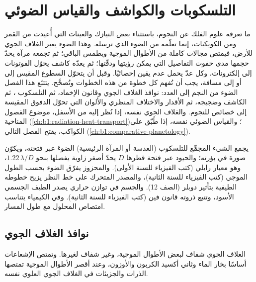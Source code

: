 \chapter{التلسكوبات والكواشف والقياس الضوئي}\label{ch:b1:observing-the-sky}

ما تعرفه علوم الفلك عن النجوم، باستثناء بعض النيازك والعينات التي أُعيدت من القمر ومن الكويكبات، إنما تعلّمه من الضوء الذي ترسله. وهذا الضوء يعبر الغلاف الجوي للأرض، فيمتص مجالات كاملة من الأطوال الموجية ويطمس الباقي؛ ثم تجمعه مرآة يحدّ حجمها مدى خفوت التفاصيل التي يمكن رؤيتها ودقّتها؛ ثم يعدّه كاشف يحوّل الفوتونات إلى إلكترونات، وكل عدّ يحمل عدم يقين إحصائيًا. وقبل أن يتحوّل السطوع المقيس إلى  أو إلى مسافة، يجب أن تُفهم كل خطوة من هذه الخطوات وتُصحَّح. يتتبّع هذا الفصل الضوء من النجم إلى العدد: نوافذ الغلاف الجوي وقانون الإخماد، ثم التلسكوب ، ثم الكاشف وضجيجه، ثم الأقدار والاختلاف المنظري والألوان التي تحوّل الدفوق المقيسة إلى خصائص للنجوم. والغلاف الجوي نفسه، إذا نُظر إليه من الأسفل، موضوع الفصول المناخية (\cref{ch:b1:radiation-heat-transport})؛ والقياس الضوئي نفسه، إذا طُبّق على الكواكب، يفتح الفصل التالي (\cref{ch:b1:comparative-planetology}).

\begin{recall}
يجمع الشيء المجمِّع للتلسكوب (العدسة أو المرآة الرئيسية) الضوءَ عبر فتحته، ويكوّن صورة في بؤرته؛ والحيود عبر فتحة قطرها $D$ يحدّ أصغر زاوية يفصلها بنحو $1.22\,\lambda/D$، وهو معيار رايلي (كتب الفيزياء للسنة الأولى). والمحزوز يفرّق الضوء بحسب الطول الموجي (كتب الفيزياء للسنة الثانية)، والمصدر المتحرك على خط النظر يزيح خطوطه الطيفية بتأثير دوبلر (الصف 12). والجسم في توازن حراري يصدر الطيف الجسمي الأسود، وتتبع ذروته قانون فين (كتب الفيزياء للسنة الثانية). وفي الكيمياء يتناسب امتصاص المحلول مع طول المسار.
\end{recall}

\section{نوافذ الغلاف الجوي}

الغلاف الجوي شفاف لبعض الأطوال الموجية، وغير شفاف لغيرها. وتمتص الإشعاعات أساسًا بخار الماء وثاني أكسيد الكربون والأوزون، وعند أقصر الأطوال الموجية تمتصها الذرات والجزيئات في الغلاف الجوي العلوي نفسه.


